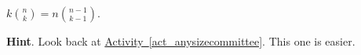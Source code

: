 \documentclass{book}
\begin{document}
\setcounter{cpjt}{106}
\addtocounter{cpjt}{-1}
\begin{activity}\label{activity-99}
\hypertarget{p-728}{}%
\(k \binom{n}{k} = n \binom{n - 1}{k - 1}\).%
\par\smallskip%
\noindent\textbf{Hint}.\hypertarget{hint-60}{}\quad%
\hypertarget{p-729}{}%
Look back at \hyperref[act_anysizecommittee]{Activity~\ref{act_anysizecommittee}}.  This one is easier.%
\par\smallskip%
\noindent\end{activity}

\clearpage
\end{document}
